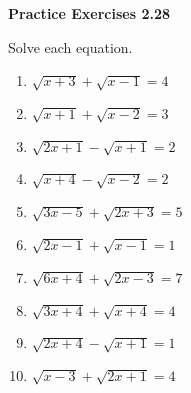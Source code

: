 \vspace{1ex}
\noindent\textbf{Practice Exercises 2.28}

\vspace{0.75ex}

Solve each equation.

\begin{multicols}{2}
\begin{enumerate}[noitemsep, label = \color{blue}\arabic*. ]
    \item \( \sqrt{x + 3} + \sqrt{x - 1} = 4 \)
    \item \( \sqrt{x + 1} + \sqrt{x - 2} = 3 \)
    \item \( \sqrt{2x + 1} - \sqrt{x + 1} = 2 \)
    \item \( \sqrt{x + 4} - \sqrt{x - 2} = 2 \)
    \item \( \sqrt{3x - 5} + \sqrt{2x + 3} = 5 \)
    \item \( \sqrt{2x - 1} + \sqrt{x - 1} = 1 \)
    \item \( \sqrt{6x + 4} + \sqrt{2x - 3} = 7 \)
    \item \( \sqrt{3x + 4} + \sqrt{x + 4} = 4 \)
    \item \( \sqrt{2x + 4} - \sqrt{x + 1} = 1 \)
    \item \( \sqrt{x - 3} + \sqrt{2x + 1} = 4 \)
\end{enumerate}
\end{multicols}
